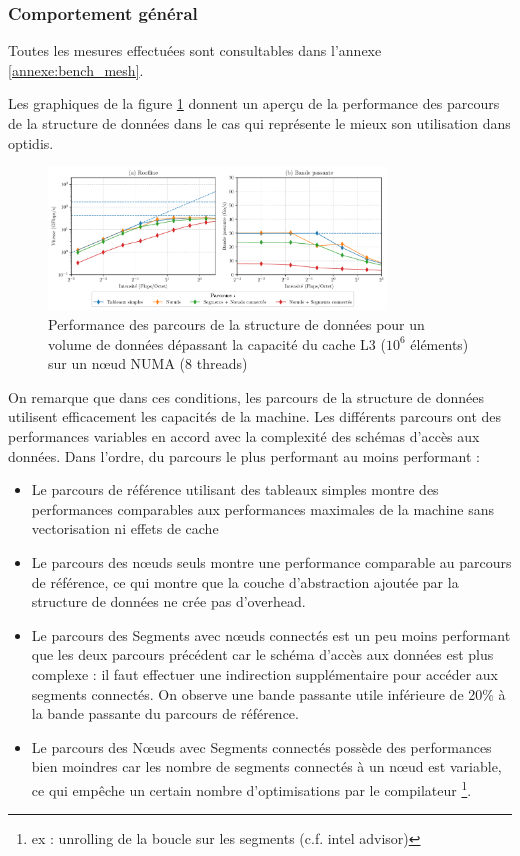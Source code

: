\subsubsection{Comportement général}

Toutes les mesures effectuées sont consultables dans l'annexe \ref{annexe:bench_mesh}.

Les graphiques de la figure \ref{fig:bench_mesh_comportement_general} donnent un aperçu de la performance des parcours de la structure de données dans le cas qui représente le mieux son utilisation dans optidis. 

\begin{figure}
    \centering
    \includegraphics[width=0.8\textwidth]{img/bench_mesh_omp.pdf}
    \caption{Performance des parcours de la structure de données pour un volume de données dépassant la capacité du cache L3 ($10^6$ éléments) sur un nœud NUMA (8 threads)}
    \label{fig:bench_mesh_comportement_general}
\end{figure}

On remarque que dans ces conditions, les parcours de la structure de données utilisent efficacement les capacités de la machine. Les différents parcours ont des performances variables en accord avec la complexité des schémas d'accès aux données. Dans l'ordre, du parcours le plus performant au moins performant :
\begin{itemize}
    \item Le parcours de référence utilisant des tableaux simples montre des performances comparables aux performances maximales de la machine sans vectorisation ni effets de cache
    \item Le parcours des nœuds seuls montre une performance comparable au parcours de référence, ce qui montre que la couche d'abstraction ajoutée par la structure de données ne crée pas d'overhead.
    \item Le parcours des Segments avec nœuds connectés est un peu moins performant que les deux parcours précédent car le schéma d'accès aux données est plus complexe : il faut effectuer une indirection supplémentaire pour accéder aux segments connectés. On observe une bande passante utile inférieure de 20\% à la bande passante du parcours de référence.
    \item Le parcours des Nœuds avec Segments connectés possède des performances bien moindres car les nombre de segments connectés à un nœud est variable, ce qui empêche un certain nombre d'optimisations par le compilateur \footnote{ex : unrolling de la boucle sur les segments (c.f. intel advisor)}.
\end{itemize}

